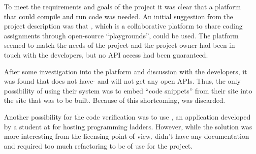 To meet the requirements and goals of the project it was clear that a platform that could compile and run code was needed. An initial suggestion from the project description was that \techio{}, which is a collaborative platform to share coding assignments through open-source ``playgrounds'', could be used. The platform seemed to match the needs of the project and the project owner had been in touch with the developers, but no API access had been guaranteed. 

After some investigation into the platform and discussion with the developers, it was found that \techio{} does not have- and will not get any open APIs. Thus, the only possibility of using their system was to  embed ``code snippets'' from their site into the site that was to be built. Because of this shortcoming, \techio{} was discarded.

Another possibility for the code verification was to use \sockr{}, an application developed by a student at \LTU{} for hosting programming ladders. However, while the solution was more interesting from the licensing point of view, \sockr{} didn't have any documentation and required too much refactoring to be of use for the project.


